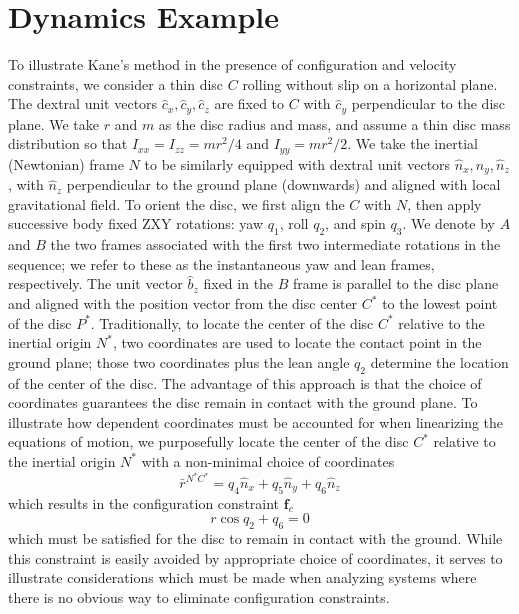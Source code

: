 \documentclass[smallcondensed,final]{svjour3}                     %
\begin{document}
\section{Dynamics Example}
To illustrate Kane's method in the presence of configuration and velocity
constraints, we consider a thin disc $C$ rolling without slip on a horizontal
plane. The dextral unit vectors $\hat{c}_x, \hat{c}_y, \hat{c}_z$ are fixed to $C$
with $\hat{c}_y$ perpendicular to the disc plane. We take $r$ and $m$ as the
disc radius and mass, and assume a thin disc mass distribution so that
$I_{xx}=I_{zz}=mr^2/4$ and $I_{yy} = mr^2/2$. We take the inertial (Newtonian)
frame $N$ to be similarly equipped with dextral unit vectors $\hat{n}_x,
\hat{n}_y, \hat{n}_z$, with $\hat{n}_z$ perpendicular to the ground plane
(downwards) and aligned with local gravitational field. To orient the disc, we
first align the $C$ with $N$, then apply successive body fixed ZXY rotations:
yaw $q_1$, roll $q_2$, and spin $q_3$.  We denote by $A$ and $B$ the two frames
associated with the first two intermediate rotations in the sequence; we refer
to these as the instantaneous yaw and lean frames, respectively. The unit
vector $\hat{b}_z$ fixed in the $B$ frame is parallel to the disc plane and
aligned with the position vector from the disc center $C^*$ to the lowest point
of the disc $P^*$. Traditionally, to locate the center of the disc $C^*$
relative to the inertial origin $N^*$, two coordinates are used to locate the
contact point in the ground plane; those two coordinates plus the lean angle
$q_2$ determine the location of the center of the disc. The advantage of this
approach is that the choice of coordinates guarantees the disc remain in
contact with the ground plane. To illustrate how dependent coordinates must be
accounted for when linearizing the equations of motion, we purposefully locate
the center of the disc $C^*$ relative to the inertial origin $N^*$ with a
non-minimal choice of coordinates
\begin{equation*}
  \bar{r}^{N^*C^*} = q_4 \hat{n}_x + q_5 \hat{n}_y + q_6 \hat{n}_z
\end{equation*}
which results in the configuration constraint $\mathbf{f}_c$
\begin{equation}
  \label{rd:f_c}
  r\cos{q_2} + q_6 = 0
\end{equation}
which must be satisfied for the disc to remain in contact with the ground.
While this constraint is easily avoided by appropriate choice of coordinates,
it serves to illustrate considerations which must be made when analyzing
systems where there is no obvious way to eliminate configuration constraints.
\end{document}
